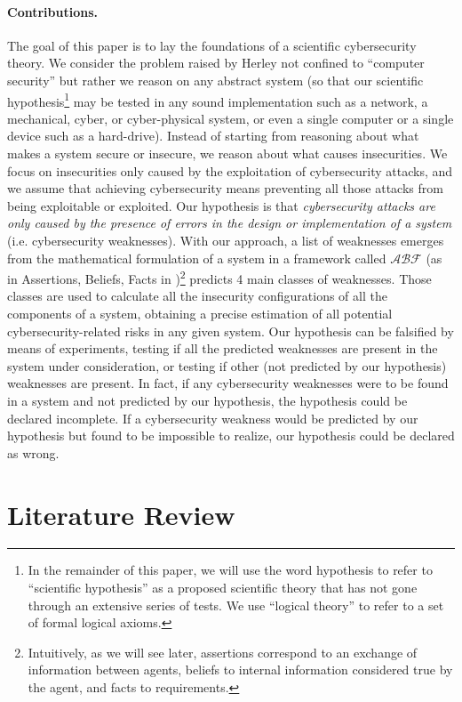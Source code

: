 \documentclass[runningheads]{llncs}
\newcommand{\assertionRegion}{\mathcal{A}}
\newcommand{\beliefRegion}{\mathcal{B}}
\newcommand{\factRegion}{\mathcal{F}}
\newcommand{\abftheory}{\assertionRegion\beliefRegion\factRegion}
\begin{document}
\paragraph{Contributions.} 
The goal of this paper is to lay the foundations of a scientific cybersecurity
theory.  We consider the problem raised by Herley not confined to ``computer
security'' but rather we reason on any abstract system (so that our scientific
hypothesis\footnote{In the remainder of this paper, we will use the word
hypothesis to refer to ``scientific hypothesis'' as a proposed scientific
theory that has not gone through an extensive series of tests. We
use ``logical theory'' to refer to a set of formal logical axioms.} may
be tested in any sound implementation such as a network, a mechanical, cyber, or
cyber-physical system, or even a single computer or a single device such as a
hard-drive).  
Instead of starting from reasoning about what makes a system secure or insecure,
we reason about what causes insecurities. 
We focus on insecurities only caused by
the exploitation of cybersecurity attacks, and we assume that achieving
cybersecurity means preventing all those attacks from being exploitable or
exploited.  Our hypothesis is that \emph{cybersecurity attacks are only caused by the
presence of errors in the design or implementation of a system} (i.e.
cybersecurity weaknesses).
With our approach, a list of weaknesses emerges from the mathematical
formulation of a system in a framework called $\abftheory$ (as in Assertions,
Beliefs, Facts in \autocite{Santaca2016abf})\footnote{Intuitively, as we will
see later, assertions correspond to an exchange of
information between agents, beliefs to internal
information considered true by the agent, and facts to
requirements.} predicts 4 main classes of weaknesses. Those classes are used to
calculate all the insecurity configurations of all the components of a system,
obtaining a precise estimation of all potential cybersecurity-related risks in
any given system. Our hypothesis can be falsified by means of experiments,
testing if all the predicted weaknesses are present in the system under consideration,
or testing if other (not predicted by our hypothesis) weaknesses are present.
In fact, if any cybersecurity weaknesses were to be found in a system and not
predicted by our hypothesis, the hypothesis could be declared incomplete.  If a
cybersecurity weakness would be predicted by our hypothesis but found to be impossible
to realize, our hypothesis could be declared as wrong.

\section{Literature Review}\label{sec:literature}
\end{document}
